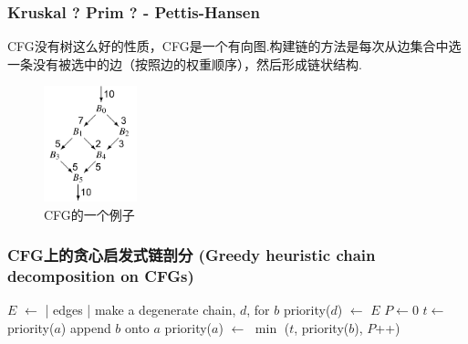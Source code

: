 \begin{frame}[fragile]
    \frametitle{Kruskal ? Prim ? - Pettis-Hansen}

    CFG没有树这么好的性质，CFG是一个有向图.构建链的方法是每次从边集合中选一条没有被选中的边（按照边的权重顺序），然后形成链状结构.

    \begin{figure}
        \centering
        \includegraphics[width=0.24\textwidth]{images/example_cfg.png}
        \caption{CFG的一个例子\cite{cooper2011engineering}}
    \end{figure}



\end{frame}

\begin{frame}
    \frametitle{CFG上的贪心启发式链剖分 (Greedy heuristic chain decomposition on CFGs)}

    \begin{algorithmic}
        \State $E$ $\gets$ | edges |
        \State make a degenerate chain, $d$, for $b$
        \State priority($d$) $\gets$ $E$
        \EndFor
        \State $P \gets 0$
        \State $ t \gets $ priority($a$)
        \State append $b$ onto $a$
        \State priority($a$) $\gets$ $\min$ ($t$, priority($b$), $P$++)
        \EndFor
    \end{algorithmic}


\end{frame}


